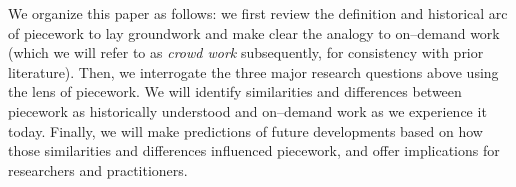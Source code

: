 \documentclass[trackingWork]{subfiles}
\begin{document}
We organize this paper as follows: we first review the definition and historical arc of piecework to lay  groundwork and make clear the analogy to on--demand work (which we will refer to as \textit{crowd work} subsequently, for consistency with prior literature). Then, we interrogate the three major research questions above using the lens of piecework. 
We will identify similarities and differences between piecework as historically understood and
on--demand work as we experience it today.
Finally, we will make predictions of future developments based on how those similarities and differences influenced piecework, and offer implications for researchers and practitioners.


\onlyinsubfile{
  \balance{}
  \printbibliography
}
\end{document}
